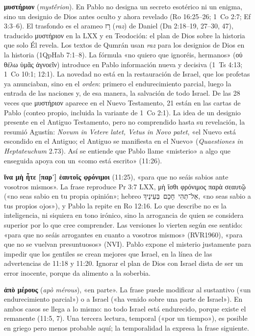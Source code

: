 \documentclass[11pt,letterpaper]{article}
\newcommand{\heb}[1]{\mbox{\foreignlanguage{hebrew}{#1}}}
\newcommand{\grc}[1]{\foreignlanguage{ancientgreek}{#1}}
\begin{document}
\textbf{\grc{μυστήριον}} (\emph{mystḗrion}). En Pablo no designa un secreto esotérico ni un enigma, sino un designio de Dios antes oculto y ahora revelado (Ro 16:25--26; 1~Co 2:7; Ef 3:3--6). El trasfondo es el arameo \foreignlanguage{hebrew}{רָז} (\emph{raz}) de Daniel (Dn 2:18--19, 27--30, 47), traducido \grc{μυστήριον} en la LXX y en Teodoción: el plan de Dios sobre la historia que solo Él revela. Los textos de Qumrán usan \emph{raz} para los designios de Dios en la historia (1QpHab 7:1--8). La fórmula «no quiero que ignoréis, hermanos» (\grc{οὐ θέλω ὑμᾶς ἀγνοεῖν}) introduce en Pablo información nueva y decisiva (1~Ts 4:13; 1~Co 10:1; 12:1). La novedad no está en la restauración de Israel, que los profetas ya anunciaban, sino en el \emph{orden}: primero el endurecimiento parcial, luego la entrada de las naciones y, de esa manera, la salvación de todo Israel. De las 28 veces que \grc{μυστήριον} aparece en el Nuevo Testamento, 21 están en las cartas de Pablo (conteo propio, incluida la variante de 1~Co 2:1). La idea de un designio presente en el Antiguo Testamento, pero no comprendido hasta su revelación, la resumió Agustín: \emph{Novum in Vetere latet, Vetus in Novo patet}, «el Nuevo está escondido en el Antiguo; el Antiguo se manifiesta en el Nuevo» (\emph{Quaestiones in Heptateuchum} 2.73). Así se entiende que Pablo llame «misterio» a algo que enseguida apoya con un «como está escrito» (11:26).

\textbf{\grc{ἵνα μὴ ἦτε [παρ᾿] ἑαυτοῖς φρόνιμοι}} (11:25), «para que no seáis sabios ante vosotros mismos». La frase reproduce Pr 3:7 LXX, \grc{μὴ ἴσθι φρόνιμος παρὰ σεαυτῷ} («no seas sabio en tu propia opinión»; hebreo \heb{אַל־תְּהִי חָכָם בְּעֵינֶיךָ}, «no seas sabio a tus propios ojos»), y Pablo la repite en Ro 12:16. Lo que describe no es la inteligencia, ni siquiera en tono irónico, sino la arrogancia de quien se considera superior por lo que cree comprender. Las versiones lo vierten según ese sentido: «para que no seáis arrogantes en cuanto a vosotros mismos» (RVR1960), «para que no se vuelvan presuntuosos» (NVI). Pablo expone el misterio justamente para impedir que los gentiles se crean mejores que Israel, en la línea de las advertencias de 11:18 y 11:20. Ignorar el plan de Dios con Israel dista de ser un error inocente, porque da alimento a la soberbia.

\textbf{\grc{ἀπὸ μέρους}} (\emph{apò mérous}), «en parte». La frase puede modificar al sustantivo («un endurecimiento parcial») o a Israel («ha venido sobre una parte de Israel»). En ambos casos se llega a lo mismo: no todo Israel está endurecido, porque existe el remanente (11:5, 7). Una tercera lectura, temporal («por un tiempo»), es posible en griego pero menos probable aquí; la temporalidad la expresa la frase siguiente.
\end{document}

